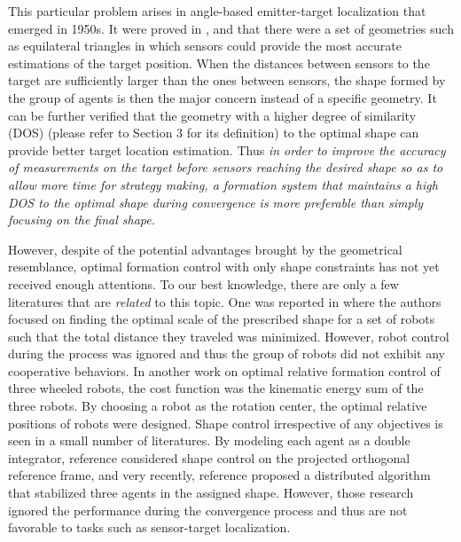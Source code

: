 \documentclass[times]{rncauth}
\begin{document}
This particular problem arises in angle-based emitter-target
localization  that emerged in
1950s\cite{Bishop09bearingOnlyLocalization}. It were proved in
\cite{Bishop10sensor}, \cite{Dogancay08AOA} and
\cite{Zhang05contour} that there were a set of geometries such as
equilateral triangles in which sensors could provide  the most
accurate estimations of the target position. When the distances
between sensors to the
 target are  sufficiently larger than the ones between sensors, the shape formed by
 the group of agents is then the major concern instead of a specific geometry. It can be further
verified that the geometry with a higher degree of similarity (DOS) (please refer to Section 3 for its definition) to the optimal shape can provide better target location estimation. Thus \emph{in order to improve the accuracy of measurements on the target before sensors reaching the desired shape so as to allow more time for strategy making, a formation  system that maintains a high DOS to the optimal shape during convergence is more preferable than simply focusing on the final shape.}


However, despite of the potential advantages brought by the
geometrical resemblance, optimal formation control  with only shape
constraints has not yet received enough attentions. To our best
knowledge, there are only a few literatures that are \emph{related}
to this topic. One was reported in
\cite{Spletzer05optimalPositioning} where the authors focused on
finding the optimal scale of the prescribed shape for a set of
robots such that the total distance they traveled was minimized.
However, robot control during the process was ignored and thus the
group of robots did not exhibit any  cooperative behaviors. In
another work\cite{Bhatt09geometric} on optimal relative formation
control of three wheeled robots, the cost function was the kinematic
energy sum of the three robots. By choosing a robot as the rotation
center, the optimal relative positions of robots were designed.
Shape control irrespective of any objectives is seen in a small
number of literatures. By modeling each agent as a double
integrator, reference \cite{Pais09formationShape} considered shape control on
the projected orthogonal reference frame, and very recently,
reference \cite{Basiri10angleonly} proposed a distributed algorithm that
stabilized three agents in the assigned shape. However, those research ignored the performance during the convergence process and thus are not  favorable to tasks such as sensor-target localization.
\end{document}
